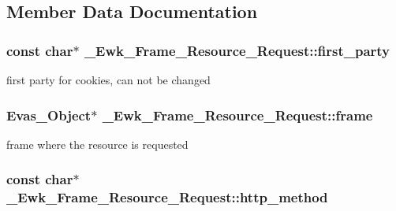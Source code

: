 \subsection{Member Data Documentation}
\hypertarget{struct__Ewk__Frame__Resource__Request_aadd34ea642faad2fe02b490fc99685fa}{
\subsubsection[{first\+\_\+party}]{\setlength{\rightskip}{0pt plus 5cm}const char$\ast$ \+\_\+\+Ewk\+\_\+\+Frame\+\_\+\+Resource\+\_\+\+Request\+::first\+\_\+party}}\label{struct__Ewk__Frame__Resource__Request_aadd34ea642faad2fe02b490fc99685fa}
first party for cookies, can not be changed \hypertarget{struct__Ewk__Frame__Resource__Request_a92ed91ff7edf6730f0328830d335b7cb}{
\subsubsection[{frame}]{\setlength{\rightskip}{0pt plus 5cm}Evas\+\_\+\+Object$\ast$ \+\_\+\+Ewk\+\_\+\+Frame\+\_\+\+Resource\+\_\+\+Request\+::frame}}\label{struct__Ewk__Frame__Resource__Request_a92ed91ff7edf6730f0328830d335b7cb}
frame where the resource is requested \hypertarget{struct__Ewk__Frame__Resource__Request_aa8fe1c1fa66619f6d779a34d83a93697}{
\subsubsection[{http\+\_\+method}]{\setlength{\rightskip}{0pt plus 5cm}const char$\ast$ \+\_\+\+Ewk\+\_\+\+Frame\+\_\+\+Resource\+\_\+\+Request\+::http\+\_\+method}}\label{struct__Ewk__Frame__Resource__Request_aa8fe1c1fa66619f6d779a34d83a93697}
